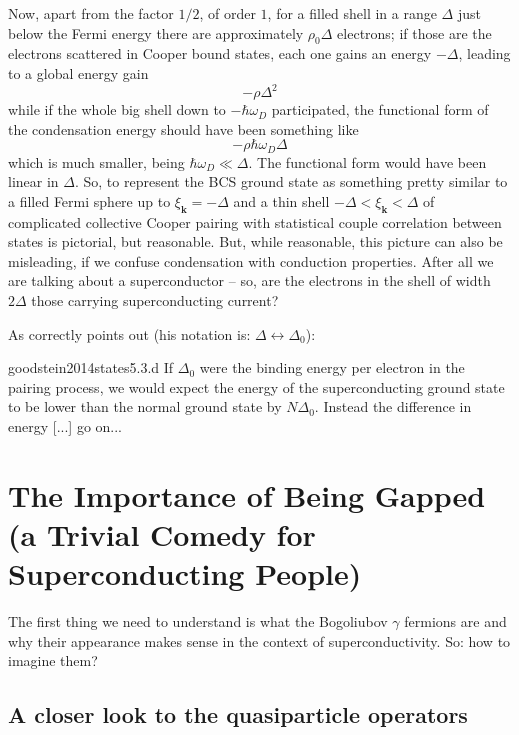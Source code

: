Now, apart from the factor $1/2$, of order $1$, for a filled shell in a range $\Delta$ just below the Fermi energy there are approximately $\rho_0 \Delta$ electrons; if those are the electrons scattered in Cooper bound states, each one gains an energy $-\Delta$, leading to a global energy gain
\[
	- \rho \Delta^2
\]
while if the whole big shell down to $-\hbar\omega_D$ participated, the functional form of the condensation energy should have been something like
\[
	- \rho \hbar\omega_D \Delta
\]
which is much smaller, being $\hbar\omega_D \ll \Delta$. The functional form would have been linear in $\Delta$. So, to represent the BCS ground state as something pretty similar to a filled Fermi sphere up to $\xi_\mathbf{k} = - \Delta$ and a thin shell $- \Delta < \xi_\mathbf{k} < \Delta$ of complicated collective Cooper pairing with statistical couple correlation between states is pictorial, but reasonable. But, while reasonable, this picture can also be misleading, if we confuse condensation with conduction properties. After all we are talking about a superconductor -- so, are the electrons in the shell of width $2\Delta$ those carrying superconducting current?

As \citeauthor{goodstein2014states} correctly points out (his notation is: $\Delta \leftrightarrow \Delta_0$):

\begin{cit}{goodstein2014states}{5.3.d}
	If $\Delta_0$ were the binding energy per electron in the pairing process, we would expect the energy of the superconducting ground state to be lower than the normal ground state by $N\Delta_0$. Instead the difference in energy [...] {\color{red}go on...}
\end{cit}

\section[The Importance of Being Gapped]{The Importance of Being Gapped \newline \small (a Trivial Comedy for Superconducting People)}\label{sec:the importance of being gapped}

The first thing we need to understand is what the Bogoliubov $\gamma$ fermions are and why their appearance makes sense in the context of superconductivity. So: how to imagine them?

\subsection{A closer look to the quasiparticle operators}\label{subsec:a closer look the quasiparticle operators}

